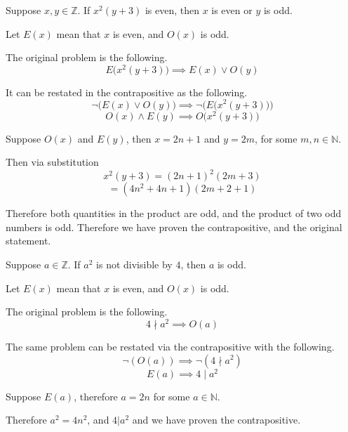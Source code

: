 \documentclass[openany, 12pt]{book}
\begin{document}
\begin{exercise}{}{}
	Suppose $x,y \in \mathbb{Z}$. If $x^2(y+3)$ is even, then
	$x$ is even or $y$ is odd.
	\begin{alist}
		\item Let $E(x)$ mean that $x$ is even, and $O(x)$ is odd.
		\item The original problem is the following.
		$$
			E\big(x^2(y+3)\big)
			\implies
			E(x) \lor O(y)
		$$
		\item It can be restated in the contrapositive as the following.
		$$
			\neg\big(E(x) \lor O(y)\big)
			\implies
			\neg\big(E\big(x^2(y+3)\big)\big)
		$$
		$$
			O(x) \land E(y)
			\implies
			O\big(x^2(y+3)\big)
		$$
		\item Suppose $O(x)$ and $E(y)$, then $x=2n+1$ and $y=2m$, for some $m,n \in
			\mathbb{N}$.
		\item Then via substitution
		$$x^2(y+3) = (2n+1)^2 (2m+3)$$
		$$ = (4n^2 + 4n +1) (2m+2+1)$$
		\item Therefore both quantities in the product are odd, and the product of two
		odd numbers is odd. Therefore we have proven the contrapositive, and the
		original statement.
	\end{alist}
\end{exercise}

\begin{exercise}{}{}
	Suppose $a \in \mathbb{Z}$. If $a^2$ is not divisible by $4$, then $a$ is odd.
	\begin{alist}
		\item Let $E(x)$ mean that $x$ is even, and $O(x)$ is odd.
		\item The original problem is the following.
		$$
			4 \nmid a^2
			\implies
			O(a)
		$$
		\item The same problem can be restated via the contrapositive with the
		following.
		$$
			\neg(O(a))
			\implies
			\neg(4 \nmid a^2)
		$$
		$$
			E(a)
			\implies
			4 \mid a^2
		$$
		\item Suppose $E(a)$, therefore $a = 2n$ for some $a \in \mathbb{N}$.
		\item Therefore $a^2 = 4n^2$, and $4 | a^2$ and we have proven the
		contrapositive.
	\end{alist}
\end{exercise}
\end{document}
